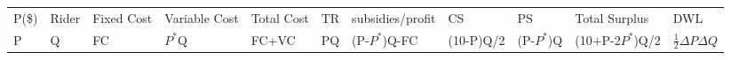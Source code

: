\documentclass[10pt,portrait]{article}
\begin{document}
\begin{tabular}{l|l|l|l|l|l|l|l|l|l|l}
P(\$)&Rider&Fixed Cost&Variable Cost&Total Cost&TR&subsidies/profit&CS&PS&Total Surplus& DWL\\
P  & Q &FC &$P^*$Q &FC+VC  &PQ &(P-$P^*$)Q-FC &(10-P)Q/2&(P-$P^*$)Q &(10+P-2$P^*$)Q/2&$\frac12\Delta P\Delta Q$
\end{tabular}
\end{document}
